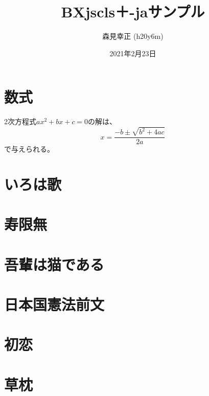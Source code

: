 \documentclass[xelatex,ja=xelatexja,a4paper,10pt,twocolumn]{bxjsarticle}
\title{BXjscls＋\XeLaTeX-jaサンプル}
\author{森見幸正 (h20y6m)}
\date{2021年2月23日}
\begin{document}
\maketitle

\section{数式}

2次方程式$ax^2+bx+c=0$の解は、
\[ x = \frac{-b\pm\sqrt{b^2+4ac}}{2a} \]
で与えられる。

\section{いろは歌}

\section{寿限無}

\section{吾輩は猫である}

\section{日本国憲法前文}

\section{初恋}

\section{草枕}
\end{document}
